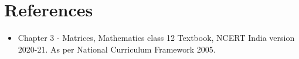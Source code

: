 \documentclass[12pt, letterpaper]{article}
\begin{document}
\section{References}
\begin{itemize}
    \item Chapter 3 - Matrices, Mathematics class 12 Textbook, NCERT India version 2020-21. As per National Curriculum Framework 2005. 
\end{itemize}
\end{document}

